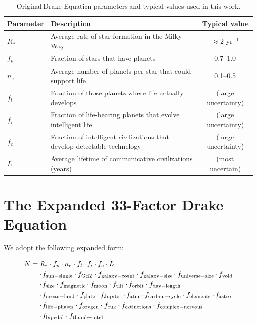 \documentclass[12pt]{article}
\begin{document}
\begin{table}[H]
\centering
\caption{Original Drake Equation parameters and typical values used in this work.}
\begin{tabular}{l p{} c}
\toprule
\textbf{Parameter} & \textbf{Description} & \textbf{Typical value} \\
\midrule
$R_*$     & Average rate of star formation in the Milky Way & $\approx 2$ yr$^{-1}$ \\
$f_p$     & Fraction of stars that have planets & 0.7--1.0 \\
$n_e$     & Average number of planets per star that could support life & 0.1--0.5 \\
$f_l$     & Fraction of those planets where life actually develops & (large uncertainty) \\
$f_i$     & Fraction of life-bearing planets that evolve intelligent life & (large uncertainty) \\
$f_c$     & Fraction of intelligent civilizations that develop detectable technology & (large uncertainty) \\
$L$       & Average lifetime of communicative civilizations (years) & (most uncertain) \\
\bottomrule
\end{tabular}
\end{table}

\section{The Expanded 33-Factor Drake Equation}
We adopt the following expanded form:

\[
\begin{split}
N = & \; R_* \cdot f_p \cdot n_e \cdot f_l \cdot f_i \cdot f_c \cdot L \\
& \cdot f_{\rm sun-single} \cdot f_{\rm GHZ} \cdot f_{\rm galaxy-count} \cdot f_{\rm galaxy-size} \cdot f_{\rm universe-size} \cdot f_{\rm void} \\
& \cdot f_{\rm size} \cdot f_{\rm magnetic} \cdot f_{\rm moon} \cdot f_{\rm tilt} \cdot f_{\rm orbit} \cdot f_{\rm day-length} \\
& \cdot f_{\rm ocean-land} \cdot f_{\rm plate} \cdot f_{\rm Jupiter} \cdot f_{\rm atm} \cdot f_{\rm carbon-cycle} \cdot f_{\rm elements} \cdot f_{\rm astro} \\
& \cdot f_{\rm life-phases} \cdot f_{\rm oxygen} \cdot f_{\rm euk} \cdot f_{\rm extinctions} \cdot f_{\rm complex-nervous} \\
& \cdot f_{\rm bipedal} \cdot f_{\rm thumb-intel}
\end{split}
\]
\end{document}
